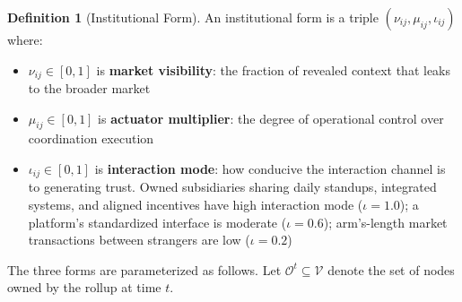 \documentclass[12pt]{article}
\theoremstyle{definition}
\newtheorem{definition}{Definition}
\begin{document}
\begin{definition}[Institutional Form]
An institutional form is a triple $(\nu_{ij}, \mu_{ij}, \iota_{ij})$ where:
\begin{itemize}
\item $\nu_{ij} \in [0,1]$ is \textbf{market visibility}: the fraction of revealed context that leaks to the broader market
\item $\mu_{ij} \in [0,1]$ is \textbf{actuator multiplier}: the degree of operational control over coordination execution
\item $\iota_{ij} \in [0,1]$ is \textbf{interaction mode}: how conducive the interaction channel is to generating trust. Owned subsidiaries sharing daily standups, integrated systems, and aligned incentives have high interaction mode ($\iota = 1.0$); a platform's standardized interface is moderate ($\iota = 0.6$); arm's-length market transactions between strangers are low ($\iota = 0.2$)
\end{itemize}
\end{definition}

The three forms are parameterized as follows. Let $\mathcal{O}^t \subseteq \mathcal{V}$ denote the set of nodes owned by the rollup at time $t$.
\end{document}
